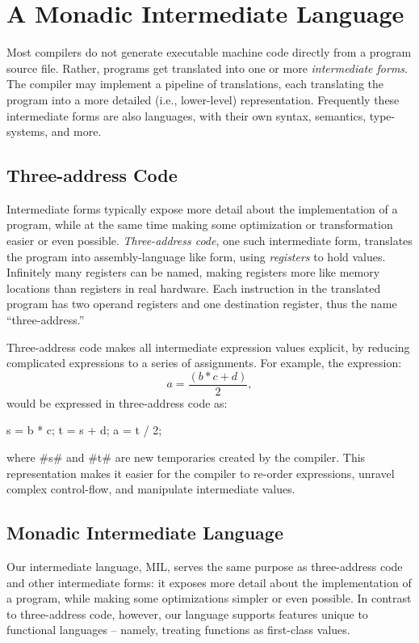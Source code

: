 \documentclass[12pt]{report}
\begin{document}


\chapter{A Monadic Intermediate Language}
\label{ref_chapter_mil}

Most compilers do not generate executable machine code directly from a
program source file. Rather, programs get translated into one or more
\emph{intermediate forms}. The compiler may implement a pipeline of
translations, each translating the program into a more detailed (i.e.,
lower-level) representation. Frequently these intermediate forms are 
also languages, with their own syntax, semantics, type-systems,
and more. 

\section{Three-address Code}

Intermediate forms typically expose more detail about the
implementation of a program, while at the same time making some
optimization or transformation easier or even possible. 
\emph{Three-address code}, one such intermediate form, translates the
program into assembly-language like form, using \emph{registers} to
hold values. Infinitely many registers can be named, making registers
more like memory locations than registers in real hardware. Each
instruction in the translated program has two operand registers and one
destination register, thus the name ``three-address.'' 

Three-address code makes all intermediate expression values explicit, 
by reducing complicated expressions to a series of assignments. 
For example, the expression:
\[a = \frac{(b * c + d)}{2},\]
would be expressed in three-address code as:
\begin{AVerb}
  s = b * c;
  t = s + d;
  a  = t / 2;
\end{AVerb}
where #s# and #t# are new temporaries created by the compiler. This 
representation makes it easier for the compiler to re-order expressions,
unravel complex control-flow, and manipulate intermediate values. 

\section{Monadic Intermediate Language}

Our intermediate language, MIL, serves the same purpose as 
three-address code and other intermediate forms: it exposes
more detail about the implementation of a program, while
making some optimizations simpler or even possible. In contrast to
three-address code, however, our language supports features 
unique to functional languages -- namely, treating functions as
first-class values. 
\end{document}

